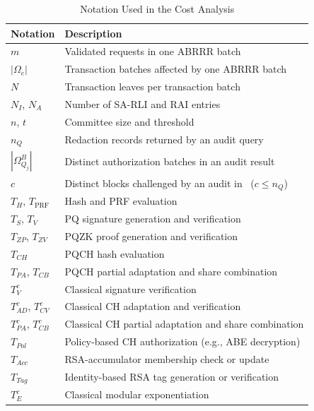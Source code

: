 \documentclass[lettersize,journal]{IEEEtran}
\begin{document}
    \begin{table}[t]
    \centering
    \caption{Notation Used in the Cost Analysis}
    \label{tab:cost-notation}
    \scriptsize
    \renewcommand{\arraystretch}{1.08}
    \setlength{\tabcolsep}{3pt}
    \begin{tabular}{ll}
    \hline
    \textbf{Notation} & \textbf{Description} \\
    \hline
    $m$ & Validated requests in one ABRRR batch \\
    $|\Omega_e|$ & Transaction batches affected by one ABRRR batch \\
    $N$ & Transaction leaves per transaction batch \\
    $N_I$, $N_A$ & Number of SA-RLI and RAI entries \\
    $n$, $t$ & Committee size and threshold \\
    $n_Q$ & Redaction records returned by an audit query \\
    $|\Omega_{Q_j}^B|$ & Distinct authorization batches in an audit result \\
    $c$ & Distinct blocks challenged by an audit in~\cite{ref13} ($c\le n_Q$) \\
    \hline
    $T_H$, $T_{\mathrm{PRF}}$ & Hash and PRF evaluation \\
    $T_S$, $T_V$ & PQ signature generation and verification \\
    $T_{ZP}$, $T_{ZV}$ & PQZK proof generation and verification \\
    $T_{CH}$ & PQCH hash evaluation \\
    $T_{PA}$, $T_{CB}$ & PQCH partial adaptation and share combination \\
    $T_V^{c}$ & Classical signature verification \\
    $T_{AD}^{c}$, $T_{CV}^{c}$ & Classical CH adaptation and verification \\
    $T_{PA}^{c}$, $T_{CB}^{c}$ & Classical CH partial adaptation and share combination \\
    $T_{Pol}$ & Policy-based CH authorization (e.g., ABE decryption) \\
    $T_{Acc}$ & RSA-accumulator membership check or update \\
    $T_{Tag}$ & Identity-based RSA tag generation or verification~\cite{ref13} \\
    $T_E^{c}$ & Classical modular exponentiation \\
    \hline
    \end{tabular}
    \end{table}
    
\end{document}
